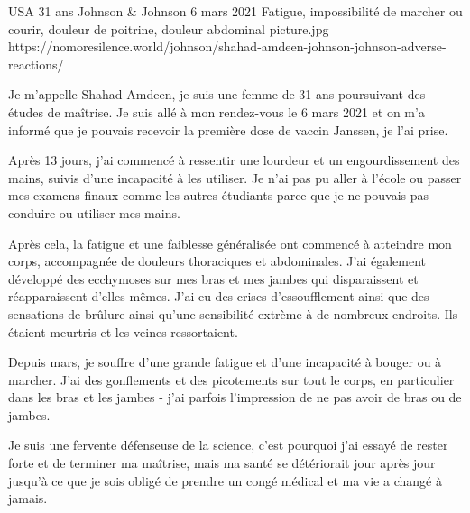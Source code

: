 {USA}
{31 ans}
{Johnson \& Johnson}
{6 mars 2021}
{Fatigue, impossibilité de marcher ou courir, douleur de poitrine, douleur abdominal}
{picture.jpg}
{https://nomoresilence.world/johnson/shahad-amdeen-johnson-johnson-adverse-reactions/}
{

Je m'appelle Shahad Amdeen, je suis une femme de 31 ans poursuivant des études
de maîtrise. Je suis allé à mon rendez-vous le 6 mars 2021 et on m'a informé que
je pouvais recevoir la première dose de vaccin Janssen, je l'ai prise.

Après 13 jours, j'ai commencé à ressentir une lourdeur et un engourdissement des
mains, suivis d'une incapacité à les utiliser. Je n'ai pas pu aller à l'école ou
passer mes examens finaux comme les autres étudiants parce que je ne pouvais pas
conduire ou utiliser mes mains.

Après cela, la fatigue et une faiblesse généralisée ont commencé à atteindre mon
corps, accompagnée de douleurs thoraciques et abdominales. J'ai également
développé des ecchymoses sur mes bras et mes jambes qui disparaissent et
réapparaissent d'elles-mêmes. J'ai eu des crises d'essoufflement ainsi que des
sensations de brûlure ainsi qu'une sensibilité extrème à de nombreux
endroits. Ils étaient meurtris et les veines ressortaient.

Depuis mars, je souffre d'une grande fatigue et d'une incapacité à bouger ou à
marcher. J'ai des gonflements et des picotements sur tout le corps, en
particulier dans les bras et les jambes - j'ai parfois l'impression de ne pas
avoir de bras ou de jambes.

Je suis une fervente défenseuse de la science, c'est pourquoi j'ai essayé de
rester forte et de terminer ma maîtrise, mais ma santé se détériorait jour après
jour jusqu'à ce que je sois obligé de prendre un congé médical et ma vie a
changé à jamais.

}
